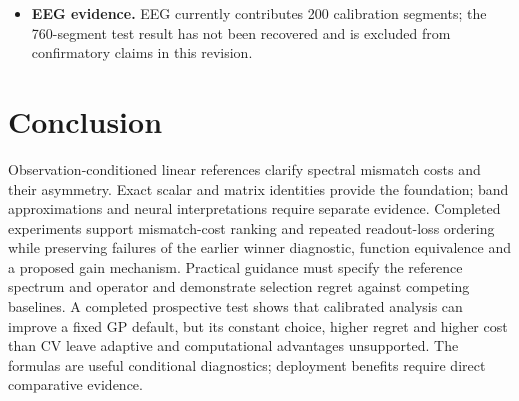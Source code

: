 \begin{itemize}
noise settings with fixed draws, one operator and one 32-image calibration.
Zero observed severe degradations does not certify a population rate below
5\%. Analysis chooses the same prior in all cases, so its improvement
over the default does not establish target-specific adaptation. It trails
CV in accuracy and cost. Four-probe variability, calibration mismatch and
unobserved spectral components remain limitations; no INR architecture
selection is established. Oracle candidates were not all saved as pixels.
\item \textbf{EEG evidence.} EEG currently contributes 200 calibration segments;
the 760-segment test result has not been recovered and is excluded from
confirmatory claims in this revision.
\end{itemize}

\section{Conclusion}
Observation-conditioned linear references clarify spectral mismatch costs
and their asymmetry. Exact scalar and matrix identities provide the
foundation; band approximations and neural interpretations require
separate evidence. Completed experiments support mismatch-cost ranking
and repeated readout-loss ordering while preserving failures of the earlier
winner diagnostic, function equivalence and a proposed gain mechanism. Practical
guidance must specify the reference spectrum and operator and demonstrate
selection regret against competing baselines. A completed prospective test
shows that calibrated analysis can improve a fixed GP default, but its
constant choice, higher regret and higher cost than CV leave adaptive and
computational advantages unsupported. The formulas are useful conditional
diagnostics; deployment benefits require direct comparative evidence.
